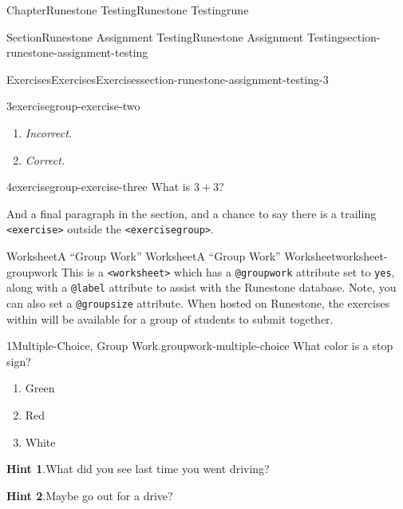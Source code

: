 \documentclass[oneside,10pt,]{book}
\newcommand{\blocktitlefont}{\relax}
\newcommand{\mono}[1]{\texttt{#1}}
\newcommand{\lititle}[1]{{\slshape#1}}
\numberwithin{equation}{section}
\begin{document}
\begin{chapterptx}{Chapter}{Runestone Testing}{}{Runestone Testing}{}{}{rune}
\begin{sectionptx}{Section}{Runestone Assignment Testing}{}{Runestone Assignment Testing}{}{}{section-runestone-assignment-testing}
\begin{exercises-subsection-numberless}{Exercises}{Exercises}{}{Exercises}{}{}{section-runestone-assignment-testing-3}
\begin{exercisegroup}
\begin{divisionexerciseeg}{3}{}{}{exercisegroup-exercise-two}
\begin{enumerate}[label={\Alph*.}]
\item{}\lititle{Incorrect.}\par%
%
\item{}\lititle{Correct.}\par%
%
\end{enumerate}
%
\end{divisionexerciseeg}%
\end{exercisegroup}
\par\medskip\noindent
\begin{divisionexercise}{4}{}{}{exercisegroup-exercise-three}%
What is \(3+3\)?%
\end{divisionexercise}%
\end{exercises-subsection-numberless}
And a final paragraph in the section, and a chance to say there is a trailing \mono{<exercise>} outside the \mono{<exercisegroup>}.%
\end{sectionptx}
%
%
\typeout{************************************************}
\typeout{************************************************}
%
\begin{worksheet-section}{Worksheet}{A ``Group Work'' Worksheet}{}{A ``Group Work'' Worksheet}{}{}{worksheet-groupwork}
This is a \mono{<worksheet>} which has a \mono{@groupwork} attribute set to \mono{yes}, along with a \mono{@label} attribute to assist with the Runestone database.  Note, you can also set a \mono{@groupsize} attribute.  When hosted on Runestone, the exercises within will be available for a group of students to submit together.%
\begin{divisionexercise}{1}{Multiple-Choice, Group Work.}{}{groupwork-multiple-choice}%
%
%
What color is a stop sign?%
\par
%
\begin{enumerate}[label={\Alph*.}]
\item{}Green%
\item{}Red%
\item{}White%
\end{enumerate}
%
\par\smallskip%
\noindent\textbf{\blocktitlefont Hint 1}.\hypertarget{groupwork-multiple-choice-5}{}\quad{}What did you see last time you went driving?%
\par\smallskip%
\noindent\textbf{\blocktitlefont Hint 2}.\hypertarget{groupwork-multiple-choice-6}{}\quad{}Maybe go out for a drive?%
\par\smallskip%

\end{divisionexercise}
\end{worksheet-section}
\end{chapterptx}
\end{document}
